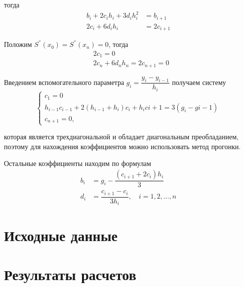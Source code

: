 \documentclass[12pt, a4paper]{article}
\begin{document}
\noindent тогда 
\[
    \begin{split}
        b_i + 2 c_i h_i + 3 d_i h_i^2 & = b_{i + 1} \\
        2 c_i + 6 d_i h_i & = 2 c_{i + 1}
    \end{split} 
\]

\pagebreak

Положим $ S^{''}(x_0) = S^{''}(x_n) = 0 $, тогда
\[
    \begin{split}
        &2 c_1 = 0 \\ 
        &2 c_n + 6 d_n h_n = 2 c_{n + 1} = 0
    \end{split}   
\]

Введением вспомогательного параметра $ g_i = \dfrac{y_i - y_{i-1}}{h_i} $ получаем систему
\[
  \begin{cases}
    c_1 = 0 \\
    h_{i - 1} c_{i - 1} + 2 (h_{i - 1} + h_i) c_i + h_i c{i + 1} = 3(g_i - g{i - 1}) \\
    c_{n + 1} = 0,
  \end{cases}  
\]

\noindent которая является трехдиагональной и обладает диагональным преобладанием, поэтому для нахождения коэффициентов можно использовать метод прогонки.

Остальные коэффициенты находим по формулам
\[
    \begin{split}
        b_i &= g_i  - \dfrac{(c_{i + 1} + 2 c_i) h_i}{3} \\ 
        d_i &= \dfrac{c_{i + 1} - c_i}{3 h_i}, \quad i = 1, 2, \ldots, n
    \end{split} 
\]


\section{Исходные данные}

\newpage

\section{Результаты расчетов}

\newpage
\end{document}
